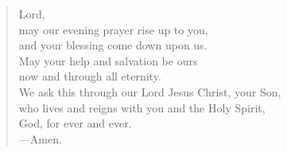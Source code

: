 \prayer

\setlength{\vleftmargin}{\prayerleftmargini}

\begin{verse}
Lord,\\
may our evening prayer rise up to you,\\
and your blessing come down upon us.\\
May your help and salvation be ours\\
now and through all eternity.\\
We ask this through our Lord Jesus Christ, your Son,\\
who lives and reigns with you and the Holy Spirit,\\
God, for ever and ever.\\
{\color{red}---\thinspace}Amen.
\end{verse}

\setlength{\vleftmargin}{\defleftmargini}